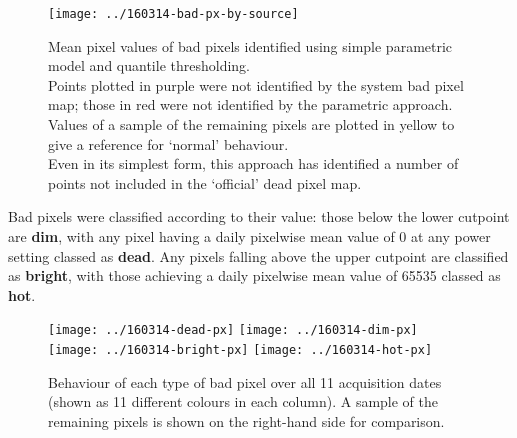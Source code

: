 \documentclass[10pt,fleqn]{article}
\begin{document}
\begin{figure}[!h]
\caption{Mean pixel values of bad pixels identified using simple parametric model and quantile thresholding.\\
Points plotted in purple were not identified by the system bad pixel map; those in red were not identified by the parametric approach.\\
Values of a sample of the remaining pixels are plotted in yellow to give a reference for `normal' behaviour.\\
Even in its simplest form, this approach has identified a number of points not included in the `official' dead pixel map.}
\texttt{[image: ../160314-bad-px-by-source]}
\end{figure}

Bad pixels were classified according to their value: those below the lower cutpoint are \textbf{dim}, with any pixel having a daily pixelwise mean value of 0 at any power setting classed as \textbf{dead}. Any pixels falling above the upper cutpoint are classified as \textbf{bright}, with those achieving a daily pixelwise mean value of 65535 classed as \textbf{hot}.

\begin{figure}[!h]
\caption{Behaviour of each type of bad pixel over all 11 acquisition dates (shown as 11 different colours in each column). A sample of the remaining pixels is shown on the right-hand side for comparison.}
\label{fig:badpx-type}
\texttt{[image: ../160314-dead-px]}
\texttt{[image: ../160314-dim-px]}
\texttt{[image: ../160314-bright-px]}
\texttt{[image: ../160314-hot-px]}
\end{figure}
\end{document}
